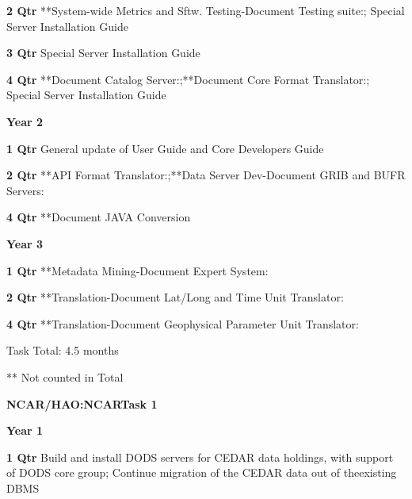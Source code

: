 \documentclass[12pt]{article}
\begin{document}
\begin{description}
\begin{description}
   \item{\bf 2 Qtr} **System-wide Metrics and Sftw. Testing-Document Testing
     suite:; Special Server Installation Guide

   \item{\bf 3 Qtr} Special Server Installation Guide

   \item{\bf 4 Qtr} **Document Catalog Server:;**Document Core
     Format Translator:; Special Server Installation Guide

   \end{description}
 \item{\large \bf Year 2}
   \begin{description}
   \item{\bf 1 Qtr} General update of User Guide and Core Developers Guide

   \item{\bf 2 Qtr} **API Format Translator:;**Data Server
     Dev-Document GRIB and BUFR Servers:

   \item{\bf 4 Qtr} **Document JAVA Conversion

   \end{description}
 \item{\large \bf Year 3}
   \begin{description}
   \item{\bf 1 Qtr} **Metadata Mining-Document Expert System:

   \item{\bf 2 Qtr} **Translation-Document Lat/Long and Time Unit
     Translator:

   \item{\bf 4 Qtr} **Translation-Document Geophysical Parameter Unit
     Translator:

 Task Total: 4.5 months

     ** Not counted in Total 


   \end{description}
\begin{center}
{\large \bf NCAR/HAO:NCARTask 1}
\end{center}

 \item{\large \bf Year 1}
   \begin{description}
   \item{\bf 1 Qtr} Build and install DODS servers for CEDAR data holdings,
     with support of DODS core group; Continue migration of the CEDAR data
     out of theexisting DBMS


\end{description}
\end{description}
\end{document}
